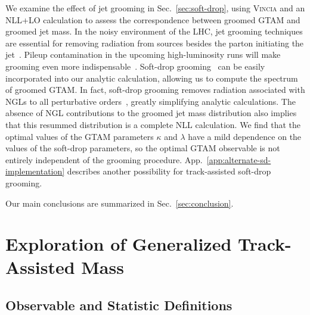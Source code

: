 \documentclass[letterpaper,11pt]{article}
\newcommand{\Sec}[1]{Sec.~\ref{#1}}
\newcommand{\App}[1]{App.~\ref{#1}}
\begin{document}

We examine the effect of jet grooming in \Sec{sec:soft-drop}, using \textsc{Vincia} and an NLL+LO calculation to assess the correspondence between groomed GTAM and groomed jet mass.
%
In the noisy environment of the LHC, jet grooming techniques are essential for removing radiation from sources besides the parton initiating the jet~\cite{Asquith:2018igt,Larkoski:2017jix}. 
%
Pileup contamination in the upcoming high-luminosity runs will make grooming even more indispensable~\cite{Contardo:2020886,ATLAS-CONF-2017-065}. 
%
Soft-drop grooming~\cite{Larkoski:2014wba} can be easily incorporated into our analytic calculation, allowing us to compute the spectrum of groomed GTAM. 
%
In fact, soft-drop grooming removes radiation associated with NGLs to all perturbative orders~\cite{Frye:2016okc,Frye:2016aiz}, greatly simplifying analytic calculations. 
%
The absence of NGL contributions to the groomed jet mass distribution also implies that this resummed distribution is a complete NLL calculation. 
%
We find that the optimal values of the GTAM parameters $\kappa$ and $\lambda$ have a mild dependence on the values of the soft-drop parameters, so the optimal GTAM observable is not entirely independent of the grooming procedure. 
%
\App{app:alternate-sd-implementation} describes another possibility for track-assisted soft-drop grooming. 

Our main conclusions are summarized in \Sec{sec:conclusion}.




\section{Exploration of Generalized Track-Assisted Mass}
\label{sec:MCexplore}



\subsection{Observable and Statistic Definitions}
\label{sec:MCexplore-definitions}
\end{document}
